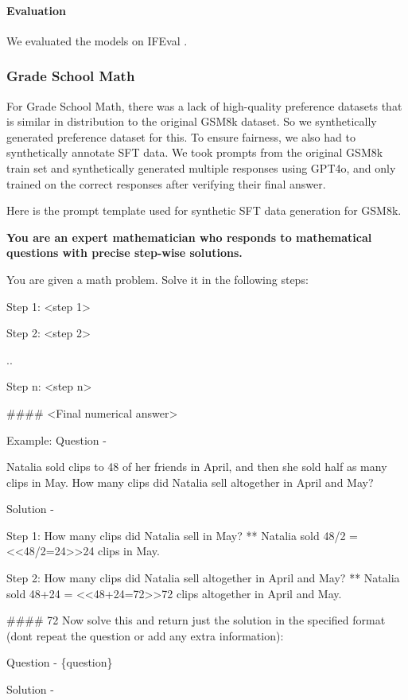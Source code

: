 \paragraph{Evaluation} We evaluated the models on IFEval \citep{zhou2023instruction}. 

\subsubsection{Grade School Math}

\label{math_data}
For Grade School Math, there was a lack of high-quality preference datasets that is similar in distribution to the original GSM8k dataset. So we synthetically generated preference dataset for this. To ensure fairness, we also had to synthetically annotate SFT data. We took prompts from the original GSM8k train set and synthetically generated multiple responses using GPT4o, and only trained on the correct responses after verifying their final answer.


Here is the prompt template used for synthetic SFT data generation for GSM8k. 


\begin{tcolorbox}[]

\textbf{You are an expert mathematician who responds to mathematical questions with precise step-wise solutions. }

\bigbreak
You are given a math problem. Solve it in the following steps:


Step 1: <step 1> 

Step 2: <step 2> 

..

Step n: <step n> 
\bigbreak

\#\#\#\# <Final numerical answer>

Example:
\bigbreak
Question - 

Natalia sold clips to 48 of her friends in April, and then she sold half as many clips in May. How many clips did Natalia sell altogether in April and May?

\bigbreak
Solution - 

Step 1: How many clips did Natalia sell in May? ** Natalia sold 48/2 = <<48/2=24>>24 clips in May.

Step 2: How many clips did Natalia sell altogether in April and May? ** Natalia sold 48+24 = <<48+24=72>>72 clips altogether in April and May.

\#\#\#\# 72
\bigbreak
Now solve this and return just the solution in the specified format (dont repeat the question or add any extra information):

Question - \{question\}

Solution - 

\end{tcolorbox}

